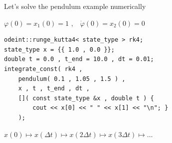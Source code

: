 \begin{frame}[fragile]
 \centerline{ \Large Let's solve the pendulum example numerically}

\vspace{2ex}
$\varphi(0) = x_1(0) = 1 \,\, \text{,} \quad \dot{\varphi}(0) = x_2(0) = 0$
\vspace{2ex}

\begin{lstlisting}
odeint::runge_kutta4< state_type > rk4;
state_type x = {{ 1.0 , 0.0 }};
double t = 0.0 , t_end = 10.0 , dt = 0.01;
integrate_const( rk4 ,
    pendulum( 0.1 , 1.05 , 1.5 ) ,
    x , t , t_end , dt ,
    []( const state_type &x , double t ) {
        cout << x[0] << " " << x[1] << "\n"; }
    );
\end{lstlisting}

\vspace{2ex}

\centerline{$x(0) \mapsto x(\Delta t) \mapsto x(2\Delta t) \mapsto x(3\Delta t) \mapsto \dots$}

\end{frame}




